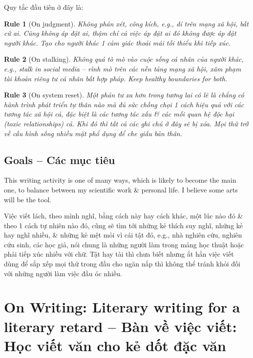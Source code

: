 \documentclass[12pt]{article}
\newtheorem{Rule}{Rule}
\begin{document}
Quy tắc đầu tiên ở đây là:
\begin{Rule}[On judgment]
	Không phán xét, công kích, e.g., dí trên mạng xã hội, bất cứ ai. Cũng không áp đặt ai, thậm chí cả việc áp đặt ai đó không được áp đặt người khác. Tạo cho người khác 1 cảm giác thoải mái tối thiểu khi tiếp xúc.
\end{Rule}

\begin{Rule}[On stalking]
	Không quá tò mò vào cuộc sống cá nhân của người khác, e.g., stalk in social media -- rình mò trên các nền tảng mạng xã hội, xâm phạm tài khoản  riêng tư cá nhân bất hợp pháp. Keep healthy boundaries for both.
\end{Rule}

\begin{Rule}[On system reset]
	Một phản tư xa hơn trong tương lai có lẽ là chẳng có hành trình phát triển tự thân nào mà đủ sức chống chọi 1 cách hiệu quả với các tương tác xã hội cả, đặc biệt là các tương tác xấu \& các mối quan hệ độc hại (toxic relationships) cả. Khi đó thì tất cả các ghi chú ở đây sẽ bị xóa. Mọi thứ trở về cấu hình sống nhiều mặt phổ dụng để che giấu bản thân.
\end{Rule} 

\subsection{Goals -- Các mục tiêu}
This writing activity is one of many ways, which is likely to become the main one, to balance between my scientific work \& personal life. I believe some arts will be the tool.

Việc viết lách, theo mình nghĩ, bằng cách này hay cách khác, một lúc nào đó \& theo 1 cách tự nhiên nào đó, cũng sẽ tìm tới những kẻ thích suy nghĩ, những kẻ hay nghĩ nhiều, \& những kẻ mệt mỏi vì cái tật đó, e.g., nhà nghiên cứu, nghiên cứu sinh, các học giả, nói chung là những người làm trong mảng học thuật hoặc phải tiếp xúc nhiều với chữ. Tật hay tài thì chưa biết nhưng ắt hẳn việc viết dùng để sắp xếp mọi thứ trong đầu cho ngăn nắp thì không thể tránh khỏi đối với những người làm việc đầu óc nhiều.

\section{On Writing: Literary writing for a literary retard -- Bàn về việc viết: Học viết văn cho kẻ dốt đặc văn}
\end{document}
